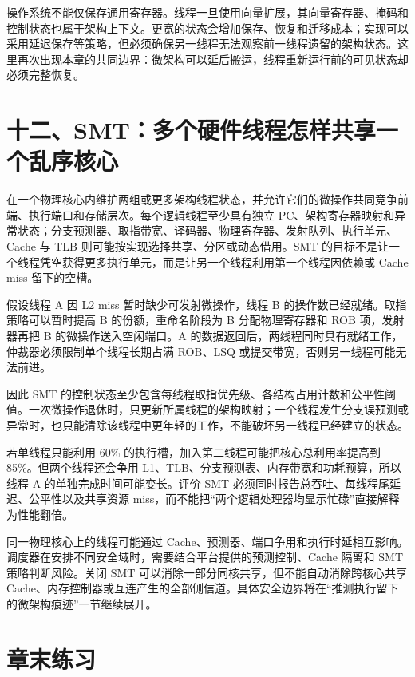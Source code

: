 操作系统不能仅保存通用寄存器。线程一旦使用向量扩展，其向量寄存器、掩码和控制状态也属于架构上下文。更宽的状态会增加保存、恢复和迁移成本；实现可以采用延迟保存等策略，但必须确保另一线程无法观察前一线程遗留的架构状态。这里再次出现本章的共同边界：微架构可以延后搬运，线程重新运行前的可见状态却必须完整恢复。

\section{十二、SMT：多个硬件线程怎样共享一个乱序核心}

 在一个物理核心内维护两组或更多架构线程状态，并允许它们的微操作共同竞争前端、执行端口和存储层次。每个逻辑线程至少具有独立 PC、架构寄存器映射和异常状态；分支预测器、取指带宽、译码器、物理寄存器、发射队列、执行单元、Cache 与 TLB 则可能按实现选择共享、分区或动态借用。SMT 的目标不是让一个线程凭空获得更多执行单元，而是让另一个线程利用第一个线程因依赖或 Cache miss 留下的空槽。\cite{arm-smt}

假设线程 A 因 L2 miss 暂时缺少可发射微操作，线程 B 的操作数已经就绪。取指策略可以暂时提高 B 的份额，重命名阶段为 B 分配物理寄存器和 ROB 项，发射器再把 B 的微操作送入空闲端口。A 的数据返回后，两线程同时具有就绪工作，仲裁器必须限制单个线程长期占满 ROB、LSQ 或提交带宽，否则另一线程可能无法前进。

因此 SMT 的控制状态至少包含每线程取指优先级、各结构占用计数和公平性阈值。一次微操作退休时，只更新所属线程的架构映射；一个线程发生分支误预测或异常时，也只能清除该线程中更年轻的工作，不能破坏另一线程已经建立的状态。

若单线程只能利用 60\% 的执行槽，加入第二线程可能把核心总利用率提高到 85\%。但两个线程还会争用 L1、TLB、分支预测表、内存带宽和功耗预算，所以线程 A 的单独完成时间可能变长。评价 SMT 必须同时报告总吞吐、每线程尾延迟、公平性以及共享资源 miss，而不能把“两个逻辑处理器均显示忙碌”直接解释为性能翻倍。

同一物理核心上的线程可能通过 Cache、预测器、端口争用和执行时延相互影响。调度器在安排不同安全域时，需要结合平台提供的预测控制、Cache 隔离和 SMT 策略判断风险。关闭 SMT 可以消除一部分同核共享，但不能自动消除跨核心共享 Cache、内存控制器或互连产生的全部侧信道。具体安全边界将在“推测执行留下的微架构痕迹”一节继续展开。

\section*{章末练习}

